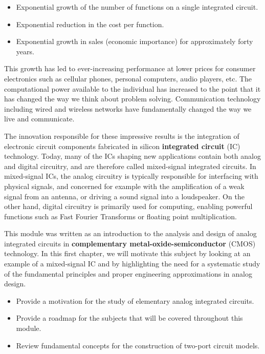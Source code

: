\documentclass[
  11pt,
  letterpaper,
  abstract]{scrbook}
\begin{document}
\begin{itemize}
\item
  Exponential growth of the number of functions on a single integrated
  circuit.
\item
  Exponential reduction in the cost per function.
\item
  Exponential growth in sales (economic importance) for approximately
  forty years.
\end{itemize}

This growth has led to ever-increasing performance at lower prices for
consumer electronics such as cellular phones, personal computers, audio
players, etc. The computational power available to the individual has
increased to the point that it has changed the way we think about
problem solving. Communication technology including wired and wireless
networks have fundamentally changed the way we live and communicate.

The innovation responsible for these impressive results is the
integration of electronic circuit components fabricated in silicon
\textbf{integrated circuit} (IC) technology. Today, many of the ICs
shaping new applications contain both analog and digital circuitry, and
are therefore called mixed-signal integrated circuits. In mixed-signal
ICs, the analog circuitry is typically responsible for interfacing with
physical signals, and concerned for example with the amplification of a
weak signal from an antenna, or driving a sound signal into a
loudspeaker. On the other hand, digital circuitry is primarily used for
computing, enabling powerful functions such as Fast Fourier Transforms
or floating point multiplication.

This module was written as an introduction to the analysis and design of
analog integrated circuits in \textbf{complementary
metal-oxide-semiconductor} (CMOS) technology. In this first chapter, we
will motivate this subject by looking at an example of a mixed-signal IC
and by highlighting the need for a systematic study of the fundamental
principles and proper engineering approximations in analog design.

\begin{tcolorbox}[enhanced jigsaw, bottomrule=.15mm, opacityback=0, colbacktitle=quarto-callout-tip-color!10!white, colframe=quarto-callout-tip-color-frame, toprule=.15mm, bottomtitle=1mm, arc=.35mm, breakable, colback=white, leftrule=.75mm, coltitle=black, toptitle=1mm, titlerule=0mm, rightrule=.15mm, title=\textcolor{quarto-callout-tip-color}{\faLightbulb}\hspace{0.5em}{Chapter Objectives}, left=2mm, opacitybacktitle=0.6]

\begin{itemize}
\item
  Provide a motivation for the study of elementary analog integrated
  circuits.
\item
  Provide a roadmap for the subjects that will be covered throughout
  this module.
\item
  Review fundamental concepts for the construction of two-port circuit
  models.
\end{itemize}

\end{tcolorbox}
\end{document}
